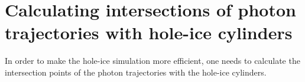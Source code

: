
\section{Calculating intersections of photon trajectories with hole-ice cylinders}

In order to make the hole-ice simulation more efficient, one needs to calculate the intersection points of the photon trajectories with the hole-ice cylinders.


\lipsum
